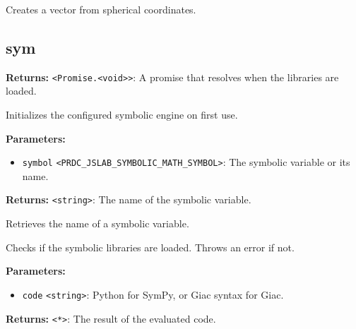 \documentclass[12pt,a4paper]{article}
\begin{document}
\noindent Creates a vector from spherical coordinates.


\subsection{sym}
\vspace{5mm}
\noindent {}


\noindent \textbf{Returns:} \texttt{<Promise.<void>>}: A promise that resolves when the libraries are loaded.

\noindent Initializes the configured symbolic engine on first use.

\vspace{5mm}
\noindent {}


\noindent \textbf{Parameters:}
\begin{itemize}
  \item \texttt{symbol} \texttt{<PRDC\_JSLAB\_SYMBOLIC\_MATH\_SYMBOL>}: The symbolic variable or its name.
\end{itemize}

\noindent \textbf{Returns:} \texttt{<string>}: The name of the symbolic variable.

\noindent Retrieves the name of a symbolic variable.

\vspace{5mm}
\noindent {}


\noindent Checks if the symbolic libraries are loaded. Throws an error if not.

\vspace{5mm}
\noindent {}


\noindent \textbf{Parameters:}
\begin{itemize}
  \item \texttt{code} \texttt{<string>}: Python for SymPy, or Giac syntax for Giac.
\end{itemize}

\noindent \textbf{Returns:} \texttt{<*>}: The result of the evaluated code.
\end{document}
